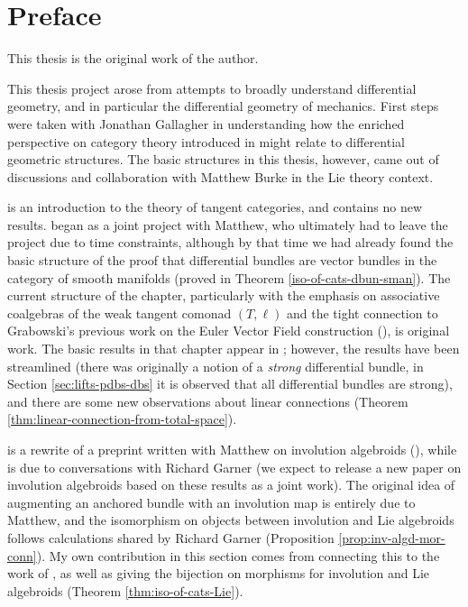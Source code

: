 \chapter{Preface}

This thesis is the original work of the author.

This thesis project arose from attempts to broadly understand differential geometry, and in particular the differential geometry of mechanics. First steps were taken with Jonathan Gallagher in understanding how the enriched perspective on category theory introduced in \cite{Garner2018} might relate to differential geometric structures. The basic structures in this thesis, however, came out of discussions and collaboration with Matthew Burke in the Lie theory context.

 is an introduction to the theory of tangent categories, and contains no new results.  
 began as a joint project with Matthew, who ultimately had to leave the project due to time constraints, although by that time we had already found the basic structure of the proof that differential bundles are vector bundles in the category of smooth manifolds (proved in Theorem \ref{iso-of-cats-dbun-sman}).
The current structure of the chapter, particularly with the emphasis on associative coalgebras of the weak tangent comonad $(T,\ell)$ and the tight connection to Grabowski's previous work on the Euler Vector Field construction (\cite{Grabowski2009}), is original work.
The basic results in that chapter appear in \cite{MacAdam2021}; however, the results have been streamlined (there was originally a notion of a \emph{strong} differential bundle, in Section \ref{sec:lifts-pdbs-dbs} it is observed that all differential bundles are strong), and there are some new observations about linear connections (Theorem \ref{thm:linear-connection-from-total-space}).

 is a rewrite of a preprint written with Matthew on involution algebroids (\cite{Burke2019}), while  is due to conversations with Richard Garner (we expect to release a new paper on involution algebroids based on these results as a joint work). The original idea of augmenting an anchored bundle with an involution map is entirely due to Matthew, and the isomorphism on objects between involution and Lie algebroids follows calculations shared by Richard Garner (Proposition \ref{prop:inv-algd-mor-conn}). My own contribution in this section comes from connecting this to the work of \cite{Martinez2001}, as well as giving the bijection on morphisms for involution and Lie algebroids (Theorem \ref{thm:iso-of-cats-Lie}).

